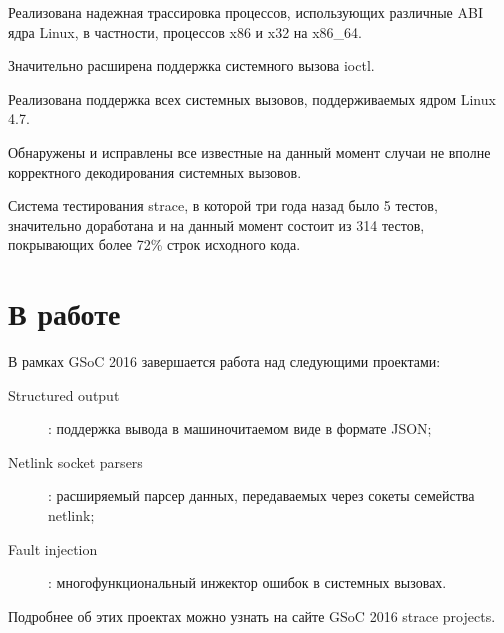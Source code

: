 \documentclass[russian,a4paper,12pt]{article}
\begin{document}
Реализована надежная трассировка процессов, использующих различные ABI ядра
Linux, в частности, процессов x86 и x32 на x86\_64.

Значительно расширена поддержка системного вызова ioctl.

Реализована поддержка всех системных вызовов, поддерживаемых ядром Linux 4.7.

Обнаружены и исправлены все известные на данный момент случаи не вполне
корректного декодирования системных вызовов.

Система тестирования strace, в которой три года назад было 5 тестов,
значительно доработана и на данный момент состоит из 314 тестов, покрывающих
более 72\% строк исходного кода.

\section*{В работе}
В рамках GSoC 2016 завершается работа над следующими проектами:
\begin{description}
\item[Structured output]: поддержка вывода в машиночитаемом виде в формате
JSON;
\item [Netlink socket parsers]: расширяемый парсер данных, передаваемых через
сокеты семейства netlink;
\item [Fault injection]: многофункциональный инжектор ошибок в системных
вызовах.
\end{description}

Подробнее об этих проектах можно узнать на сайте GSoC 2016 strace
projects\cite{gsoc2016}.
\end{document}

